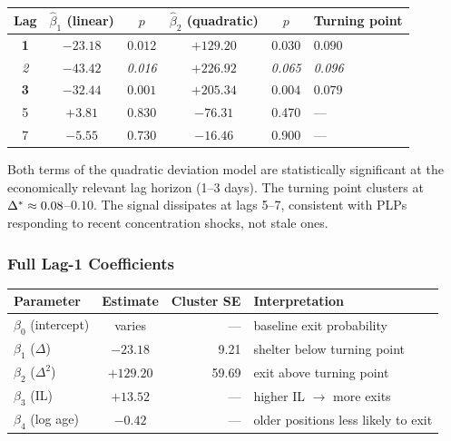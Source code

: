 \begin{center}
\begin{tabular}{@{}cccccl@{}}
\toprule
Lag & $\hat{\beta}_1$ (linear) & $p$ & $\hat{\beta}_2$ (quadratic) & $p$ & Turning point \\
\midrule
\textbf{1} & $\mathbf{-23.18}$ & $\mathbf{0.012}$ & $\mathbf{+129.20}$ & $\mathbf{0.030}$ & $\mathbf{0.090}$ \\
\textit{2} & \textit{$-43.42$} & \textit{0.016} & \textit{$+226.92$} & \textit{0.065} & \textit{0.096} \\
\textbf{3} & $\mathbf{-32.44}$ & $\mathbf{0.001}$ & $\mathbf{+205.34}$ & $\mathbf{0.004}$ & $\mathbf{0.079}$ \\
5 & $+3.81$ & 0.830 & $-76.31$ & 0.470 & --- \\
7 & $-5.55$ & 0.730 & $-16.46$ & 0.900 & --- \\
\bottomrule
\end{tabular}
\end{center}

Both terms of the quadratic deviation model are statistically significant at
the economically relevant lag horizon (1--3 days). The turning point clusters
at $\Delta^{*} \approx 0.08$--$0.10$. The signal dissipates at lags 5--7,
consistent with PLPs responding to recent concentration shocks, not stale ones.

\subsubsection{Full Lag-1 Coefficients}

\begin{center}
\begin{tabular}{@{}lcrl@{}}
\toprule
Parameter & Estimate & Cluster SE & Interpretation \\
\midrule
$\beta_0$ (intercept) & varies & --- & baseline exit probability \\
$\beta_1$ ($\Delta$) & $-23.18$ & 9.21 & shelter below turning point \\
$\beta_2$ ($\Delta^2$) & $+129.20$ & 59.69 & exit above turning point \\
$\beta_3$ (IL) & $+13.52$ & --- & higher IL $\to$ more exits \\
$\beta_4$ (log age) & $-0.42$ & --- & older positions less likely to exit \\
\bottomrule
\end{tabular}
\end{center}

